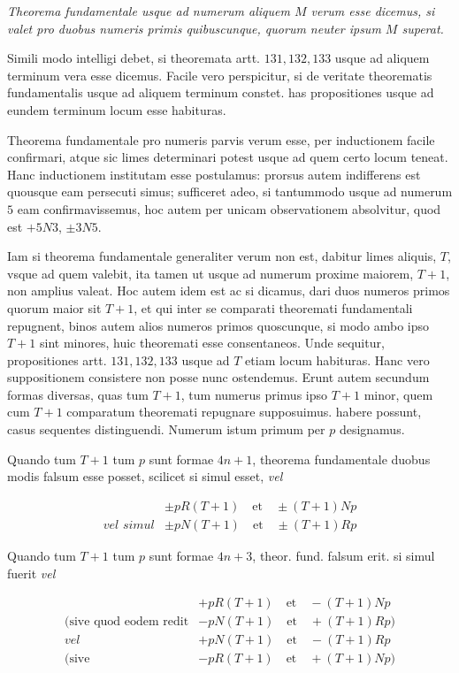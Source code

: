 \emph{Theorema fundamentale usque ad numerum aliquem $M$ verum esse dicemus, si valet pro duobus numeris primis quibuscunque, quorum neuter ipsum $M$ superat.}

Simili modo intelligi debet, si theoremata artt. $131,132,133$ usque ad aliquem terminum vera esse dicemus. Facile vero perspicitur, si de veritate theorematis fundamentalis usque ad aliquem terminum constet. has propositiones usque ad eundem terminum locum esse habituras.


Theorema fundamentale pro numeris parvis verum esse, per inductionem facile confirmari, atque sic limes determinari potest usque ad quem certo locum teneat. Hanc inductionem institutam esse postulamus: prorsus autem indifferens est quousque eam persecuti simus; sufficeret adeo, si tantummodo usque ad numerum $5$ eam confirmavissemus, hoc autem per unicam observationem absolvitur, quod est $+5N3$, $\pm3N5$.

Iam si theorema fundamentale generaliter verum non est, dabitur limes aliquis, $T$, vsque ad quem valebit, ita tamen ut usque ad numerum proxime maiorem, $T+1$, non amplius valeat. Hoc autem idem est ac si dicamus, dari duos numeros primos quorum maior sit $T+1$, et qui inter se comparati theoremati fundamentali repugnent, binos autem alios numeros primos quoscunque, si modo ambo ipso $T+1$ sint minores, huic theoremati esse consentaneos. Unde sequitur, propositiones artt. $131,132,133$ usque ad $T$ etiam locum habituras. Hanc vero suppositionem consistere non posse nunc ostendemus. Erunt autem secundum formas diversas, quas tum $T+1$, tum numerus primus ipso $T+1$ minor, quem cum $T+1$ comparatum theoremati repugnare supposuimus. habere possunt, casus sequentes distinguendi. Numerum istum primum per $p$ designamus.

Quando tum $T+1$ tum $p$ sunt formae $4n+1$, theorema fundamentale duobus modis falsum esse posset, scilicet si simul esset, \emph{vel}

\[
\begin{array}{ll}&\pm pR(T+1)\quad\text{et}\quad\pm(T+1)Np\\\textit{vel simul}&\pm pN(T+1)\quad\text{et}\quad\pm(T+1)Rp\end{array}
\]

Quando tum $T+1$ tum $p$ sunt formae $4n+3$, theor. fund. falsum erit. si simul fuerit \emph{vel}

\[
\begin{array}{ll}&+pR(T+1)\quad\text{et}\quad-(T+1)Np\\\text{(sive quod eodem redit}&-pN(T+1)\quad\text{et}\quad+(T+1)Rp)\\\textit{vel}&+pN(T+1)\quad\text{et}\quad-(T+1)Rp\\\text{(sive}&-pR(T+1)\quad\text{et}\quad+(T+1)Np)\end{array}
\]

